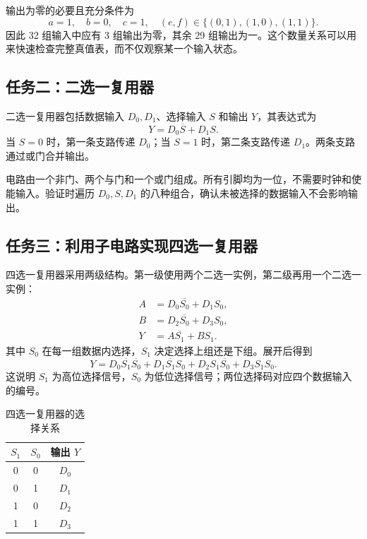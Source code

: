 \documentclass[12pt,a4paper,fontset=fandol]{ctexart}
\begin{document}
输出为零的必要且充分条件为
\begin{equation}
  a=1,\quad b=0,\quad c=1,\quad (e,f)\in\{(0,1),(1,0),(1,1)\}.
\end{equation}
因此 32 组输入中应有 3 组输出为零，其余 29 组输出为一。这个数量关系可以用来快速检查完整真值表，而不仅观察某一个输入状态。

\subsection{任务二：二选一复用器}

二选一复用器包括数据输入 $D_0,D_1$、选择输入 $S$ 和输出 $Y$，其表达式为
\begin{equation}
  Y=D_0\overline S+D_1S.
\end{equation}
当 $S=0$ 时，第一条支路传递 $D_0$；当 $S=1$ 时，第二条支路传递 $D_1$。两条支路通过或门合并输出。

电路由一个非门、两个与门和一个或门组成。所有引脚均为一位，不需要时钟和使能输入。验证时遍历 $D_0,S,D_1$ 的八种组合，确认未被选择的数据输入不会影响输出。

\subsection{任务三：利用子电路实现四选一复用器}

四选一复用器采用两级结构。第一级使用两个二选一实例，第二级再用一个二选一实例：
\begin{align}
  A &= D_0\overline{S_0}+D_1S_0,\\
  B &= D_2\overline{S_0}+D_3S_0,\\
  Y &= A\overline{S_1}+BS_1.
\end{align}
其中 $S_0$ 在每一组数据内选择，$S_1$ 决定选择上组还是下组。展开后得到
\begin{equation}
  Y=D_0\overline{S_1}\overline{S_0}
    +D_1\overline{S_1}S_0
    +D_2S_1\overline{S_0}
    +D_3S_1S_0.
\end{equation}
这说明 $S_1$ 为高位选择信号，$S_0$ 为低位选择信号；两位选择码对应四个数据输入的编号。

\begin{table}[H]
\centering
\caption{四选一复用器的选择关系}
\label{tab:mux4}
\begin{tabular}{ccc}
\toprule
$S_1$ & $S_0$ & 输出 $Y$ \\
\midrule
0 & 0 & $D_0$ \\
0 & 1 & $D_1$ \\
1 & 0 & $D_2$ \\
1 & 1 & $D_3$ \\
\bottomrule
\end{tabular}
\end{table}
\end{document}
